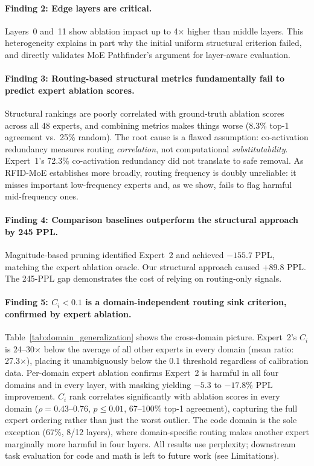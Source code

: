 \documentclass{article}
\begin{document}
\paragraph{Finding 2: Edge layers are critical.}
Layers~0 and~11 show ablation impact up to 4$\times$ higher than middle layers. This heterogeneity explains in part why the initial uniform structural criterion failed, and directly validates MoE Pathfinder's \citep{yang2025pathfinder} argument for layer-aware evaluation.

\paragraph{Finding 3: Routing-based structural metrics fundamentally fail to predict expert ablation scores.}
Structural rankings are poorly correlated with ground-truth ablation scores across all 48 experts, and combining metrics makes things worse (8.3\% top-1 agreement vs.\ 25\% random). The root cause is a flawed assumption: co-activation redundancy measures routing \emph{correlation}, not computational \emph{substitutability}. Expert~1's 72.3\% co-activation redundancy did not translate to safe removal. As RFID-MoE \citep{mi2026rfidmoe} establishes more broadly, routing frequency is doubly unreliable: it misses important low-frequency experts and, as we show, fails to flag harmful mid-frequency ones.

\paragraph{Finding 4: Comparison baselines outperform the structural approach by 245 PPL.}
Magnitude-based pruning identified Expert~2 and achieved $-155.7$ PPL, matching the expert ablation oracle. Our structural approach caused +89.8 PPL. The 245-PPL gap demonstrates the cost of relying on routing-only signals.

\paragraph{Finding 5: $C_i < 0.1$ is a domain-independent routing sink criterion, confirmed by expert ablation.}
Table~\ref{tab:domain_generalization} shows the cross-domain picture. Expert~2's $C_i$ is 24--30$\times$ below the average of all other experts in every domain (mean ratio: 27.3$\times$), placing it unambiguously below the 0.1 threshold regardless of calibration data. Per-domain expert ablation confirms Expert~2 is harmful in all four domains and in every layer, with masking yielding $-5.3$ to $-17.8\%$ PPL improvement. $C_i$ rank correlates significantly with ablation scores in every domain ($\rho = 0.43$--$0.76$, $p \leq 0.01$, 67--100\% top-1 agreement), capturing the full expert ordering rather than just the worst outlier. The code domain is the sole exception (67\%, 8/12 layers), where domain-specific routing makes another expert marginally more harmful in four layers. All results use perplexity; downstream task evaluation for code and math is left to future work (see Limitations).
\end{document}

